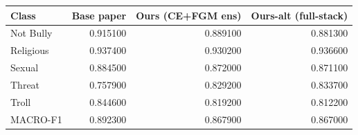 \begin{tabular}{lrrr}
\toprule
Class & Base paper & Ours (CE+FGM ens) & Ours-alt (full-stack) \\
\midrule
Not Bully & 0.915100 & 0.889100 & 0.881300 \\
Religious & 0.937400 & 0.930200 & 0.936600 \\
Sexual & 0.884500 & 0.872000 & 0.871100 \\
Threat & 0.757900 & 0.829200 & 0.833700 \\
Troll & 0.844600 & 0.819200 & 0.812200 \\
MACRO-F1 & 0.892300 & 0.867900 & 0.867000 \\
\bottomrule
\end{tabular}
